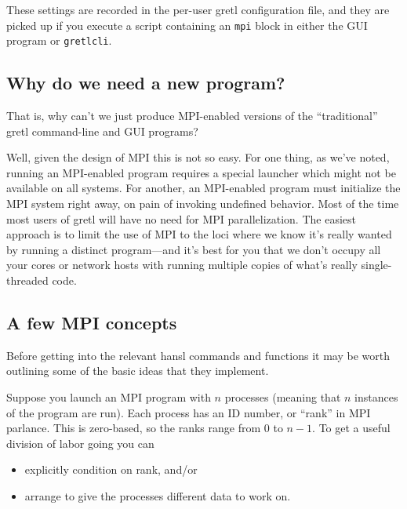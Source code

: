 \documentclass{article}
\begin{document}
These settings are recorded in the per-user gretl configuration file,
and they are picked up if you execute a script containing an
\texttt{mpi} block in either the GUI program or \texttt{gretlcli}.

\subsection{Why do we need a new program?}
\label{subsec:why-new-prog}

That is, why can't we just produce MPI-enabled versions of the
``traditional'' gretl command-line and GUI programs? 

Well, given the design of MPI this is not so easy. For one thing, as
we've noted, running an MPI-enabled program requires a special
launcher which might not be available on all systems. For another, an
MPI-enabled program must initialize the MPI system right away, on pain
of invoking undefined behavior. Most of the time most users of gretl
will have no need for MPI parallelization. The easiest approach is to
limit the use of MPI to the loci where we know it's really wanted by
running a distinct program---and it's best for you that we don't
occupy all your cores or network hosts with running multiple copies of
what's really single-threaded code.

\subsection{A few MPI concepts}
\label{subsec:concepts}

Before getting into the relevant hansl commands and functions it may
be worth outlining some of the basic ideas that they implement.

Suppose you launch an MPI program with $n$ processes (meaning that $n$
instances of the program are run). Each process has an ID number, or
``rank'' in MPI parlance. This is zero-based, so the ranks range from
0 to $n-1$. To get a useful division of labor going you can
\begin{itemize}
\item explicitly condition on rank, and/or
\item arrange to give the processes different data to work on.
\end{itemize}
\end{document}
